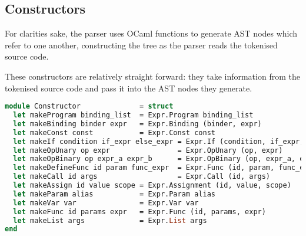 \documentclass{l4proj}
\begin{document}
\subsection{Constructors}

For clarities sake, the parser uses OCaml functions to generate AST nodes which refer to one another, constructing the tree as the parser reads the tokenised source code.

These constructors are relatively straight forward: they take information from the tokenised source code and pass it into the AST nodes they generate.

\begin{lstlisting}[language=Caml, keepspaces=true, caption=PyFunc frontend AST constructor functions.]
module Constructor              = struct
  let makeProgram binding_list  = Expr.Program binding_list
  let makeBinding binder expr   = Expr.Binding (binder, expr)
  let makeConst const           = Expr.Const const
  let makeIf condition if_expr else_expr = Expr.If (condition, if_expr, else_expr)
  let makeOpUnary op expr                = Expr.OpUnary (op, expr)
  let makeOpBinary op expr_a expr_b      = Expr.OpBinary (op, expr_a, expr_b)
  let makeDefineFunc id param func_expr  = Expr.Func (id, param, func_expr)
  let makeCall id args                   = Expr.Call (id, args)
  let makeAssign id value scope = Expr.Assignment (id, value, scope)
  let makeParam alias           = Expr.Param alias
  let makeVar var               = Expr.Var var
  let makeFunc id params expr   = Expr.Func (id, params, expr)
  let makeList args             = Expr.List args
end
\end{lstlisting}






\end{document}
